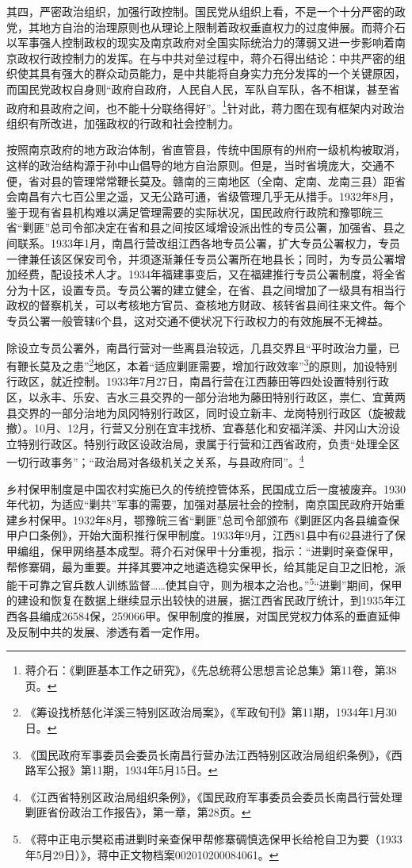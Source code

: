 其四，严密政治组织，加强行政控制。国民党从组织上看，不是一个十分严密的政党，其地方自治的治理原则也从理论上限制着政权垂直权力的过度伸展。而蒋介石以军事强人控制政权的现实及南京政府对全国实际统治力的薄弱又进一步影响着南京政权行政控制力的发挥。在与中共对垒过程中，蒋介石得出结论：中共严密的组织使其具有强大的群众动员能力，是中共能将自身实力充分发挥的一个关键原因，而国民党政权自身则“政府自政府，人民自人民，军队自军队，各不相谋，甚至省政府和县政府之间，也不能十分联络得好”。\footnote{蒋介石：《剿匪基本工作之研究》，《先总统蒋公思想言论总集》第11卷，第38页。}针对此，蒋力图在现有框架内对政治组织有所改进，加强政权的行政和社会控制力。


按照南京政府的地方政治体制，省直管县，传统中国原有的州府一级机构被取消，这样的政治结构源于孙中山倡导的地方自治原则。但是，当时省境庞大，交通不便，省对县的管理常常鞭长莫及。赣南的三南地区（全南、定南、龙南三县）距省会南昌有六七百公里之遥，又无公路可通，省级管理几乎无从措手。1932年8月，鉴于现有省县机构难以满足管理需要的实际状况，国民政府行政院和豫鄂皖三省“剿匪”总司令部决定在省和县之间按区域增设派出性的专员公署，加强省、县之间联系。1933年1月，南昌行营改组江西各地专员公署，扩大专员公署权力，专员一律兼任该区保安司令，并须逐渐兼任专员公署所在地县长；同时，为专员公署增加经费，配设技术人才。1934年福建事变后，又在福建推行专员公署制度，将全省分为十区，设置专员。专员公署的建立健全，在省、县之间增加了一级具有相当行政权的督察机关，可以考核地方官员、查核地方财政、核转省县间往来文件。每个专员公署一般管辖6个县，这对交通不便状况下行政权力的有效施展不无裨益。


除设立专员公署外，南昌行营对一些离县治较远，几县交界且“平时政治力量，已有鞭长莫及之患”\footnote{《筹设找桥慈化洋溪三特别区政治局案》，《军政旬刊》第11期，1934年1月30日。}地区，本着“适应剿匪需要，增加行政效率”\footnote{《国民政府军事委员会委员长南昌行营办法江西特别区政治局组织条例》，《西路军公报》第11期，1934年5月15日。}的原则，加设特别行政区，就近控制。1933年7月27日，南昌行营在江西藤田等四处设置特别行政区，以永丰、乐安、吉水三县交界的一部分治地为藤田特别行政区，祟仁、宜黄两县交界的一部分治地为凤冈特别行政区，同时设立新丰、龙岗特别行政区（旋被裁撤）。10月、12月，行营又分别在宜丰找桥、宜春慈化和安福洋溪、井冈山大汾设立特别行政区。特别行政区设政治局，隶属于行营和江西省政府，负责“处理全区一切行政事务”；“政治局对各级机关之关系，与县政府同”。\footnote{《江西省特别区政治局组织条例》，《国民政府军事委员会委员长南昌行营处理剿匪省份政治工作报告》，第一章，第28页。}


乡村保甲制度是中国农村实施已久的传统控管体系，民国成立后一度被废弃。1930年代初，为适应“剿共”军事的需要，加强对基层社会的控制，南京国民政府开始重建乡村保甲。1932年8月，鄂豫皖三省“剿匪”总司令部颁布《剿匪区内各县编查保甲户口条例》，开始大面积推行保甲制度。1933年9月，江西81县中有62县进行了保甲编组，保甲网络基本成型。蒋介石对保甲十分重视，指示：“进剿时亲查保甲，帮修寨碉，最为重要。并择其要冲之地遴选稳实保甲长，给其能足自卫之旧枪，派能干可靠之官兵数人训练监督……使其自守，则为根本之治也。”\footnote{《蒋中正电示樊崧甫进剿时亲查保甲帮修寨碉慎选保甲长给枪自卫为要（1933年5月29日）》，蒋中正文物档案002010200084061。}“进剿”期间，保甲的建设和恢复在数据上继续显示出较快的进展，据江西省民政厅统计，到1935年江西各县编成26584保，259066甲。保甲制度的推展，对国民党权力体系的垂直延伸及反制中共的发展、渗透有着一定作用。


